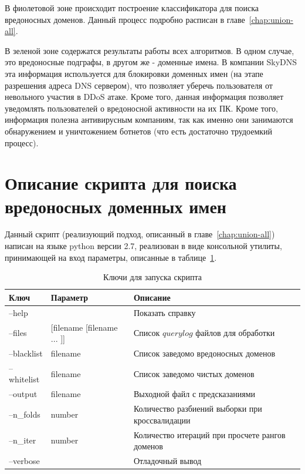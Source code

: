 \documentclass[a4paper,14pt]{extreport} %
\begin{document}
В фиолетовой зоне происходит построение классификатора для поиска вредоносных доменов. Данный процесс подробно расписан в главе~\ref{chap:union-all}.

В зеленой зоне содержатся результаты работы всех алгоритмов. В одном случае, это вредоносные подграфы, в другом же - доменные имена. В компании SkyDNS эта информация используется для блокировки доменных имен (на этапе разрешения адреса DNS сервером), что позволяет уберечь пользователя от невольного участия в DDoS атаке. Кроме того, данная информация позволяет уведомлять пользователей о вредоносной активности на их ПК. Кроме того, информация полезна антивирусным компаниям, так как именно они занимаются обнаружением и уничтожением ботнетов (что есть достаточно трудоемкий процесс).
\section{Описание скрипта для поиска вредоносных доменных имен}
Данный скрипт (реализующий подход, описанный в главе~\ref{chap:union-all}) написан на языке python версии 2.7, реализован в виде консольной утилиты, принимающей на вход параметры, описанные в таблице~\ref{tab:keys}.
\begin{table}[H]
\caption{Ключи для запуска скрипта}
\label{tab:keys}
	\begin{tabular}{|p{3cm}|p{5cm}|p{7cm}|}
		\hline
		Ключ    & Параметр           & Описание                                                                           \\ \hline
		--help      &                            & Показать справку                                                            \\ \hline
		--files     & [filename [filename ... ]] & Список $querylog$ файлов для обработки                             \\ \hline
		--blacklist & filename                   & Список заведомо вредоносных доменов                        \\ \hline
		--whitelist & filename                   & Список заведомо чистых доменов                                  \\ \hline
		--output    & filename                   & Выходной файл с предсказаниями                                  \\ \hline
		--n\_folds  & number                     & Количество разбиений выборки при кроссвалидации \\ \hline
		--n\_iter   & number                     & Количество итераций при просчете рангов доменов  \\ \hline
		--verbose   &                            & Отладочный вывод                                                            \\ \hline
	\end{tabular}
\end{table}
\end{document}
